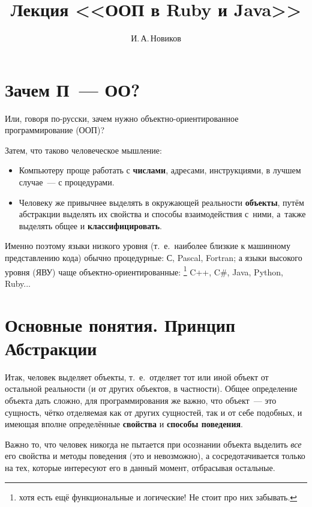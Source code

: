 \documentclass[a4paper, 14pt, titlepage]{extarticle}
\author{И.\,А.\,Новиков}
\title{Лекция <<ООП в Ruby и Java>>}
\newcommand{\strong}[1]{\textbf{#1}}
\newcommand{\ie}{т.~е.~}
\begin{document}

  \thispagestyle{empty}
  \maketitle

  \newpage

  \section{Зачем П~--- ОО?}

  Или, говоря по-русски, зачем нужно объектно-ориентированное программирование (ООП)?

  Затем, что таково человеческое мышление:
  \begin{itemize}
    \item Компьютеру проще работать с \strong{числами}, адресами, инструкциями, в лучшем случае~--- с процедурами.
    \item Человеку же привычнее выделять в окружающей реальности \strong{объекты}, путём абстракции
    выделять их свойства и способы взаимодействия с~ними, а~также выделять общее и
    \strong{классифицировать}.
  \end{itemize}

  Именно поэтому языки низкого уровня (\ie наиболее близкие к машинному представлению кода) обычно
  процедурные: С, Pascal, Fortran; а языки высокого уровня (ЯВУ) чаще объектно-ориентированные:
  \footnote{хотя есть ещё функциональные и логические! Не стоит про них забывать.}
  C++, C\#, Java, Python, Ruby...

  \section{Основные понятия. Принцип Абстракции}

  Итак, человек выделяет объекты, \ie отделяет тот или иной объект от остальной реальности (и от
  других объектов, в частности). Общее определение объекта дать сложно, для программирования же
  важно, что объект~--- это сущность, чётко отделяемая как от других сущностей, так и от себе
  подобных, и имеющая вполне определённые \strong{свойства} и \strong{способы поведения}.

  Важно то, что человек никогда не пытается при осознании объекта выделить \emph{все} его свойства и
  методы поведения (это и невозможно), а сосредотачивается только на тех, которые интересуют его в
  данный момент, отбрасывая остальные.
\end{document}
